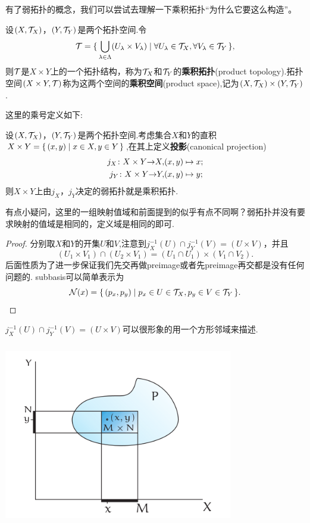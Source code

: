 有了弱拓扑的概念，我们可以尝试去理解一下乘积拓扑“为什么它要这么构造”。


\begin{definition}
设$(X,\mathcal{T}_X)$，$(Y,\mathcal{T}_Y)$是两个拓扑空间.令\[\mathcal{T} = \{\,\bigcup\limits_{\lambda \in \Lambda}(U_\lambda \times V_\lambda)\mid\forall U_\lambda \in \mathcal{T}_X, \forall V_\lambda \in \mathcal{T}_Y\,\},\]则$\mathcal{T}$是$X \times Y$上的一个拓扑结构，称为$\mathcal{T}_X$和$\mathcal{T}_Y$的\textbf{乘积拓扑}(product topology).拓扑空间$(X \times Y,\mathcal{T})$称为这两个空间的\textbf{乘积空间}(product space),记为$(X,\mathcal{T}_X) \times (Y,\mathcal{T}_Y)$.
\end{definition}


这里的乘号定义如下:

\begin{proposition}
设$(X,\mathcal{T}_X)$，$(Y,\mathcal{T}_Y)$是两个拓扑空间.考虑集合$X$和$Y$的直积$X \times Y=\{\,(x,y)\mid x \in X,y \in Y\,\}$,在其上定义\textbf{投影}(canonical  projection)\[\begin{aligned}
			{j_X}\colon{X \times Y}{\to}{X} ,& (x,y) \mapsto x;\\
			{j_Y}\colon{X \times Y}{\to}{Y} ,& (x,y) \mapsto y; 
			\end{aligned}
			\]则$X \times Y$上由$j_X$，$j_Y$决定的弱拓扑就是乘积拓扑.		
\end{proposition}

有点小疑问，这里的一组映射值域和前面提到的似乎有点不同啊？弱拓扑并没有要求映射的值域是相同的，定义域是相同的即可.

\begin{proof}
分别取$X$和$Y$的开集$U$和$V$,注意到$j_X^{-1}(U) \cap j_Y^{-1}(V)=(U \times V)$，并且\[(U_1 \times V_1) \cap (U_2 \times V_1)=(U_1 \cap U_1)\times (V_1 \cap V_2).\]后面性质为了进一步保证我们先交再做preimage或者先preimage再交都是没有任何问题的. subbasis可以简单表示为\[\mathcal{N}(x)=\{\,(p_x,p_y)\mid p_x \in U \in \mathcal{T}_X,p_y \in V \in \mathcal{T}_Y\,\}.\]
\end{proof}

$j_X^{-1}(U) \cap j_Y^{-1}(V)=(U \times V)$可以很形象的用一个方形邻域来描述.

\begin{center}
\includegraphics[width=10cm, height=8cm]{images/product_topology.png}
\end{center}

